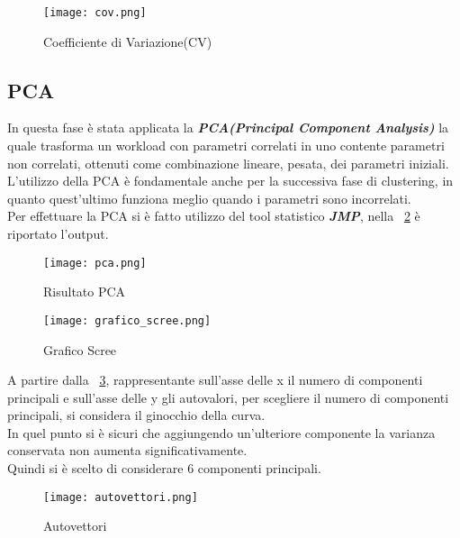\begin{figure}[!htbp]
	\texttt{[image: cov.png]}
  \caption{Coefficiente di Variazione(CV)}
  \label{}
\end{figure}

\subsection{PCA}
In questa fase è stata applicata la
\textbf{\textit{PCA(Principal Component Analysis)}}
la quale trasforma un workload con parametri correlati in uno contente parametri
non correlati, ottenuti come combinazione lineare, pesata, dei parametri iniziali.\\
L'utilizzo della PCA è fondamentale anche per la successiva fase di clustering, in
quanto quest'ultimo funziona meglio quando i parametri sono incorrelati.\\
Per effettuare la PCA si è fatto utilizzo del tool statistico \textit{\textbf{JMP}}, nella
\figurename~\ref{pca} è riportato l'output.\\

\begin{figure}[!htbp]
	\texttt{[image: pca.png]}
  \caption{Risultato PCA}
  \label{pca}
\end{figure}

\begin{figure}[!htbp]
	\texttt{[image: grafico\_scree.png]}
  \caption{Grafico Scree}
  \label{grafico_scree}
\end{figure}

A partire dalla \figurename~\ref{grafico_scree}, rappresentante
sull'asse delle x il numero di componenti principali e sull'asse delle y
gli autovalori, per scegliere il numero di componenti principali, si considera
il ginocchio della curva.\\
In quel punto si è sicuri che aggiungendo un'ulteriore componente la varianza
conservata non aumenta significativamente.\\
Quindi si è scelto di considerare 6 componenti principali.\\

\begin{figure}[!htbp]
	\texttt{[image: autovettori.png]}
  \caption{Autovettori}
  \label{autovettori}
\end{figure}


